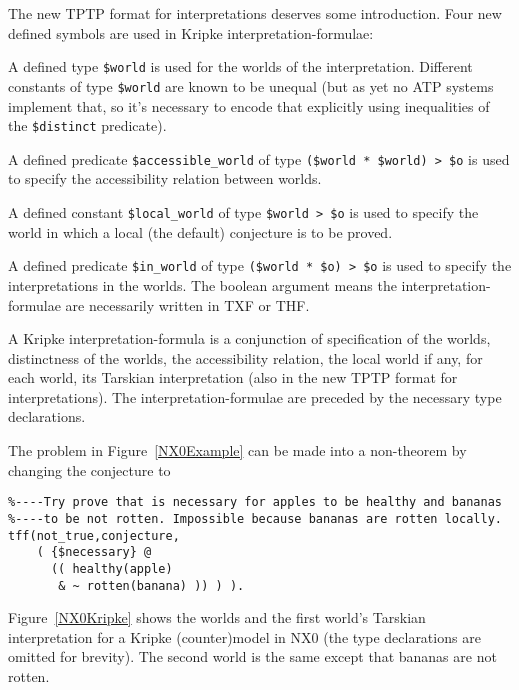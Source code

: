 \documentclass{ceurart}
\newenvironment{packed_itemize}{
\vspace*{-0.5em}
\begin{itemize}
\setlength{\partopsep}{0pt}
\setlength{\itemsep}{1pt}
\setlength{\parskip}{0pt}
\setlength{\parsep}{0pt}
}{\end{itemize}}
\begin{document}
The new TPTP format for interpretations deserves some introduction.
Four new defined symbols are used in Kripke interpretation-formulae:
\begin{packed_itemize}
\item A defined type {\tt \$world} is used for the worlds of the interpretation.
      Different constants of type {\tt \$world} are known to be unequal (but as yet no ATP 
      systems implement that, so it's necessary to encode that explicitly using inequalities of 
      the {\tt \$distinct} predicate).
\item A defined predicate {\tt \$accessible\_world} of type {\tt (\$world~*~\$world)~>~\$o}
      is used to specify the accessibility relation between worlds.
\item A defined constant {\tt \$local\_world} of type {\tt \$world~>~\$o} is used to specify 
      the world in which a local (the default) conjecture is to be proved. 
\item A defined predicate {\tt \$in\_world} of type {\tt (\$world~*~\$o)~>~\$o} is used to 
      specify the interpretations in the worlds.
      The boolean argument means the interpretation-formulae are necessarily written in TXF or THF.
\end{packed_itemize}
A Kripke interpretation-formula is a conjunction of specification of the worlds,
distinctness of the worlds,
the accessibility relation,
the local world if any,
for each world, its Tarskian interpretation (also in the new TPTP format for interpretations).
The interpretation-formulae are preceded by the necessary type declarations.

The problem in Figure~\ref{NX0Example} can be made into a non-theorem by changing the conjecture
to
\begin{verbatim}
%----Try prove that is necessary for apples to be healthy and bananas 
%----to be not rotten. Impossible because bananas are rotten locally.
tff(not_true,conjecture,
    ( {$necessary} @
      (( healthy(apple)
       & ~ rotten(banana) )) ) ).
\end{verbatim}
Figure~\ref{NX0Kripke} shows the worlds and the first world's Tarskian interpretation for 
a Kripke (counter)model in NX0 (the type declarations are omitted for brevity).
The second world is the same except that bananas are not rotten.
\end{document}
